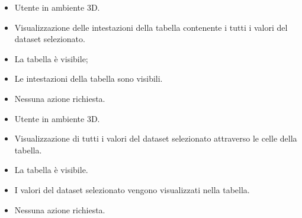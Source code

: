 \UCdsc
    { %
        \begin{itemize}
            \item Utente in ambiente 3D.
        \end{itemize}
    }
    { %
        \begin{itemize}
            \item Visualizzazione delle intestazioni della tabella contenente i tutti i valori del dataset selezionato.
        \end{itemize}
    }
    { %
        \begin{itemize}
            \item La tabella è visibile;
        \end{itemize}
    }
    { %
        \begin{itemize}
            \item Le intestazioni della tabella sono visibili.
        \end{itemize}
    }
    { %
        \begin{itemize}
            \item Nessuna azione richiesta.
        \end{itemize}
    }

\UCdsc
    { %
        \begin{itemize}
            \item Utente in ambiente 3D.
        \end{itemize}
    }
    { %
        \begin{itemize}
            \item Visualizzazione di tutti i valori del dataset selezionato attraverso le celle della tabella.
        \end{itemize}
    }
    { %
        \begin{itemize}
            \item La tabella è visibile.
        \end{itemize}
    }
    { %
        \begin{itemize}
            \item I valori del dataset selezionato vengono visualizzati nella tabella.
        \end{itemize}
    }
    { %
        \begin{itemize}
            \item Nessuna azione richiesta.
        \end{itemize}
    }


